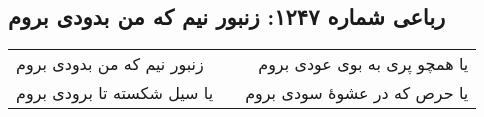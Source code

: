 \begin{center}
\section*{رباعی شماره ۱۲۴۷: زنبور نیم که من بدودی بروم}
\label{sec:1247}
\begin{longtable}{l p{0.5cm} r}
زنبور نیم که من بدودی بروم
&&
یا همچو پری به بوی عودی بروم
\\
یا سیل شکسته تا برودی بروم
&&
یا حرص که در عشوهٔ سودی بروم
\\
\end{longtable}
\end{center}
